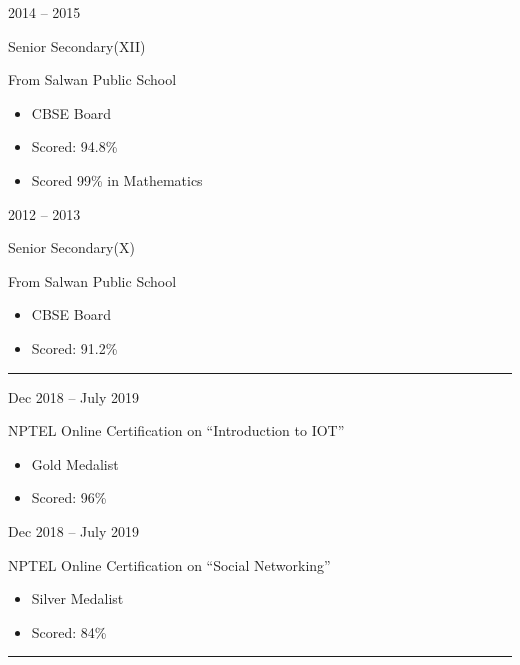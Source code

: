 \documentclass[a4paper,10pt]{article}
\newlength{\cvcolumngapwidth}
\newlength{\cvleftcolumnwidth}
\newlength{\cvrightcolumnwidth}
\newcommand{\cvsectionstyle}[1]{{\normalsize\cvsectionfont\textcolor{cvsectioncolor}{#1}}}
\newcommand{\cvtitlestyle}[1]{{\large\cvtitlefont\textcolor{cvtitlecolor}{#1}}}
\newcommand{\cvdurationstyle}[1]{{\small\cvdurationfont\textcolor{cvdurationcolor}{#1}}}
\newlength{\cvafteritemskipamount}
\newlength{\cvaftersectionskipamount}
\newlength{\cvbetweensectionandheadingextraskipamount}
\newlength{\cvaftertitleskipamount}
\newlength{\cvparskip}
\newcommand{\cvsection}[1]{
    \begin{minipage}[t]{\cvleftcolumnwidth}
        \raggedleft\cvsectionstyle{#1}
    \end{minipage}%
    \hspace{\cvcolumngapwidth}%
    \begin{minipage}[t]{\cvrightcolumnwidth}
        \textcolor{cvrulecolor}{\rule{\cvrightcolumnwidth}{0.3mm}}
    \end{minipage}

    \vspace{\cvaftersectionskipamount}
}
\newcommand{\cvitem}[2]{
    \begin{minipage}[t]{\cvleftcolumnwidth}
        \raggedleft #1
    \end{minipage}%
    \hspace{\cvcolumngapwidth}%
    \begin{minipage}[t]{\cvrightcolumnwidth}
        \setlength{\parskip}{\cvparskip} #2
    \end{minipage}

    \vspace{\cvafteritemskipamount}
}
\newcommand{\cvtitle}[1]{
    \cvtitlestyle{#1}

    \vspace{\cvaftertitleskipamount}
    \vspace{-\cvparskip}
}
\begin{document}
\cvitem{
    \cvdurationstyle{2014 -- 2015}
}{
    \cvtitle{Senior Secondary(XII)}

    From Salwan Public School

    \begin{itemize}[leftmargin=*]
        \item CBSE Board
        \item Scored: 94.8\%
        \item Scored 99\% in Mathematics
    \end{itemize}
}

\cvitem{
    \cvdurationstyle{2012 -- 2013}
}{
    \cvtitle{Senior Secondary(X)}

    From Salwan Public School

    \begin{itemize}[leftmargin=*]
        \item CBSE Board
        \item Scored: 91.2\%
    \end{itemize}
}


\cvsection{Certifications}

\cvitem{
    \cvdurationstyle{Dec 2018 -- July 2019}
}{
    \cvtitle{NPTEL Online Certification on “Introduction to IOT”}

    \begin{itemize}[leftmargin=*]
        \item Gold Medalist
        \item Scored: 96\% 
        
    \end{itemize}
}
\cvitem{
    \cvdurationstyle{Dec 2018 -- July 2019}
}{
    \cvtitle{NPTEL Online Certification on “Social Networking”}

    \begin{itemize}[leftmargin=*]
        \item Silver Medalist
        \item Scored: 84\% 
        
    \end{itemize}
}




\cvsection{Technical skills}

\vspace{\cvbetweensectionandheadingextraskipamount}
\end{document}
